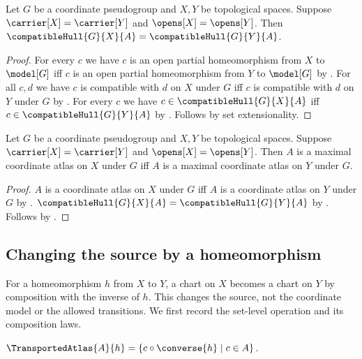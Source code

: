 \begin{theorem}\label{compatible_hull_same_fields}
    Let $G$ be a coordinate pseudogroup and $X,Y$ be topological spaces.
    Suppose $\carrier[X]=\carrier[Y]$ and $\opens[X]=\opens[Y]$.
    Then $\compatibleHull{G}{X}{A}=\compatibleHull{G}{Y}{A}$.
\end{theorem}
\begin{proof}
    For every $c$ we have $c$ is an open partial homeomorphism from $X$ to $\model[G]$
        iff $c$ is an open partial homeomorphism from $Y$ to $\model[G]$ by
        .
    For all $c,d$ we have $c$ is compatible with $d$ on $X$ under $G$ iff
        $c$ is compatible with $d$ on $Y$ under $G$ by
        .
    For every $c$ we have $c\in\compatibleHull{G}{X}{A}$ iff
        $c\in\compatibleHull{G}{Y}{A}$ by .
    Follows by set extensionality.
\end{proof}

\begin{theorem}\label{maximal_coordinate_atlas_same_fields}
    Let $G$ be a coordinate pseudogroup and $X,Y$ be topological spaces.
    Suppose $\carrier[X]=\carrier[Y]$ and $\opens[X]=\opens[Y]$.
    Then $A$ is a maximal coordinate atlas on $X$ under $G$ iff
        $A$ is a maximal coordinate atlas on $Y$ under $G$.
\end{theorem}
\begin{proof}
    $A$ is a coordinate atlas on $X$ under $G$ iff
        $A$ is a coordinate atlas on $Y$ under $G$ by
        .
    $\compatibleHull{G}{X}{A}=\compatibleHull{G}{Y}{A}$ by
        .
    Follows by .
\end{proof}

\subsection{Changing the source by a homeomorphism}

For a homeomorphism $h$ from $X$ to $Y$, a chart on $X$ becomes a chart on $Y$ by
composition with the inverse of $h$. This changes the source, not the
coordinate model or the allowed transitions. We first record the set-level
operation and its composition laws.

\begin{definition}\label{transported_atlas}
    $\TransportedAtlas{A}{h}=\{c\circ\converse{h}\mid c\in A\}$.
\end{definition}

